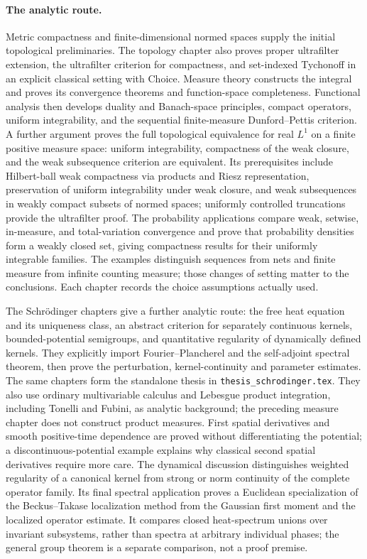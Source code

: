 \paragraph{The analytic route.}
Metric compactness and finite-dimensional normed spaces supply the
initial topological preliminaries. The topology chapter also proves
proper ultrafilter extension, the ultrafilter criterion for compactness,
and set-indexed Tychonoff in an explicit classical setting with Choice. Measure theory constructs the integral and
proves its convergence theorems and function-space completeness.
Functional analysis then develops duality and Banach-space principles,
compact operators, uniform integrability, and the sequential
finite-measure Dunford--Pettis criterion. A further argument proves
the full topological equivalence for real $L^1$ on a finite positive
measure space: uniform integrability, compactness of the weak closure,
and the weak subsequence criterion are equivalent. Its prerequisites
include Hilbert-ball weak compactness via products and Riesz
representation, preservation of uniform integrability under weak
closure, and weak subsequences in weakly compact subsets of normed
spaces; uniformly controlled truncations provide the ultrafilter proof.
The probability applications compare weak, setwise, in-measure, and
total-variation convergence and prove that probability densities form
a weakly closed set, giving compactness results for their uniformly
integrable families.
The examples distinguish sequences from nets and finite measure from
infinite counting measure; those changes of setting matter to the
conclusions. Each chapter records the choice assumptions actually used.

The Schr\"odinger chapters give a further analytic route: the free heat
equation and its uniqueness class, an abstract criterion for separately
continuous kernels, bounded-potential semigroups, and quantitative
regularity of dynamically defined kernels. They explicitly import
Fourier--Plancherel and the self-adjoint spectral theorem, then prove the
perturbation, kernel-continuity and parameter estimates. The same chapters
form the standalone thesis in \texttt{thesis\_schrodinger.tex}.
They also use ordinary multivariable calculus and Lebesgue product
integration, including Tonelli and Fubini, as analytic background; the
preceding measure chapter does not construct product measures.
First spatial derivatives and smooth positive-time dependence are proved
without differentiating the potential; a discontinuous-potential example
explains why classical second spatial derivatives require more care.
The dynamical discussion distinguishes weighted regularity of a canonical
kernel from strong or norm continuity of the complete operator family.
Its final spectral application proves a Euclidean specialization of the
Beckus--Takase localization method from the Gaussian first moment and the
localized operator estimate. It compares closed heat-spectrum unions over
invariant subsystems, rather than spectra at arbitrary individual phases;
the general group theorem is a separate comparison, not a proof premise.

